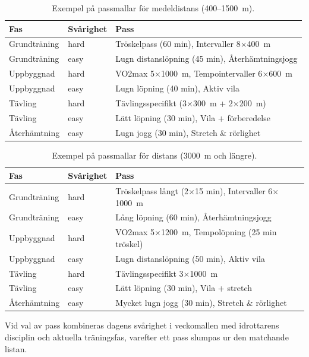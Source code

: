 \begin{table}[h]
\centering
\caption{Exempel på passmallar för medeldistans (400--1500~m).}
\label{tab:passbibliotek_medel}
\small
\begin{tabular}{l l p{}}
\hline
\textbf{Fas} & \textbf{Svårighet} & \textbf{Pass} \\
\hline
Grundträning & hard & Tröskelpass (60 min), Intervaller 8$\times$400~m \\
Grundträning & easy & Lugn distanslöpning (45 min), Återhämtningsjogg \\
Uppbyggnad   & hard & VO2max 5$\times$1000~m, Tempointervaller 6$\times$600~m \\
Uppbyggnad   & easy & Lugn löpning (40 min), Aktiv vila \\
Tävling      & hard & Tävlingsspecifikt (3$\times$300~m + 2$\times$200~m) \\
Tävling      & easy & Lätt löpning (30 min), Vila + förberedelse \\
Återhämtning & easy & Lugn jogg (30 min), Stretch \& rörlighet \\
\hline
\end{tabular}
\end{table}

\begin{table}[h]
\centering
\caption{Exempel på passmallar för distans (3000~m och längre).}
\label{tab:passbibliotek_distans}
\small
\begin{tabular}{l l p{}}
\hline
\textbf{Fas} & \textbf{Svårighet} & \textbf{Pass} \\
\hline
Grundträning & hard & Tröskelpass långt (2$\times$15 min), Intervaller 6$\times$1000~m \\
Grundträning & easy & Lång löpning (60 min), Återhämtningsjogg \\
Uppbyggnad   & hard & VO2max 5$\times$1200~m, Tempolöpning (25 min tröskel) \\
Uppbyggnad   & easy & Lugn distanslöpning (50 min), Aktiv vila \\
Tävling      & hard & Tävlingsspecifikt 3$\times$1000~m \\
Tävling      & easy & Lätt löpning (30 min), Vila + stretch \\
Återhämtning & easy & Mycket lugn jogg (30 min), Stretch \& rörlighet \\
\hline
\end{tabular}
\end{table}

Vid val av pass kombineras dagens svårighet i veckomallen med idrottarens
disciplin och aktuella träningsfas, varefter ett pass slumpas ur den
matchande listan.

